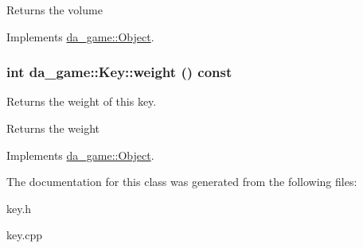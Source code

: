 \begin{DoxyReturn}{Returns}
the volume 
\end{DoxyReturn}


Implements \hyperlink{classda__game_1_1Object}{da\_\-game::Object}.\hypertarget{classda__game_1_1Key_a3a55f412166c6da8d3919978edb214e5}{
\subsubsection[{weight}]{\setlength{\rightskip}{0pt plus 5cm}int da\_\-game::Key::weight () const}}
\label{classda__game_1_1Key_a3a55f412166c6da8d3919978edb214e5}
Returns the weight of this key.

\begin{DoxyReturn}{Returns}
the weight 
\end{DoxyReturn}


Implements \hyperlink{classda__game_1_1Object}{da\_\-game::Object}.

The documentation for this class was generated from the following files:\begin{DoxyCompactItemize}
\item 
key.h\item 
key.cpp\end{DoxyCompactItemize}
